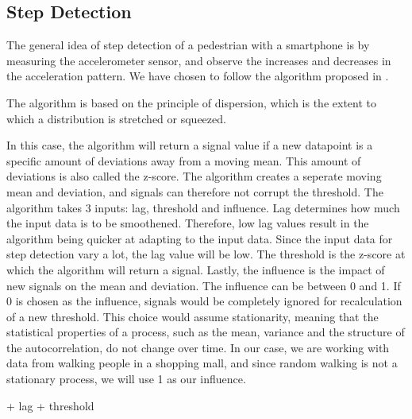 

\subsection{Step Detection}

The general idea of step detection of a pedestrian with a smartphone is by measuring the accelerometer sensor, and observe the increases and decreases in the acceleration pattern\cite{HybridPositioningPaper}. We have chosen to follow the algorithm proposed in \cite{peakdetection}. 

The algorithm is based on the principle of dispersion, which is the extent to which a distribution is stretched or squeezed. %

In this case, the algorithm will return a signal value if a new datapoint is a specific amount of deviations away from a moving mean. This amount of deviations is also called the z-score. The algorithm creates a seperate moving mean and deviation, and signals can therefore not corrupt the threshold. The algorithm takes 3 inputs: lag, threshold and influence. Lag determines how much the input data is to be smoothened. Therefore, low lag values result in the algorithm being quicker at adapting to the input data. Since the input data for step detection vary a lot, the lag value will be low. The threshold is the z-score at which the algorithm will return a signal. Lastly, the influence is the impact of new signals on the mean and deviation. The influence can be between 0 and 1. If 0 is chosen as the influence, signals would be completely ignored for recalculation of a new threshold. This choice would assume stationarity, meaning that the statistical properties of a process, such as the mean, variance and the structure of the autocorrelation, do not change over time. In our case, we are working with data from walking people in a shopping mall, and since random walking is not a stationary process, we will use 1 as our influence. 

+ lag 
+ threshold





%


